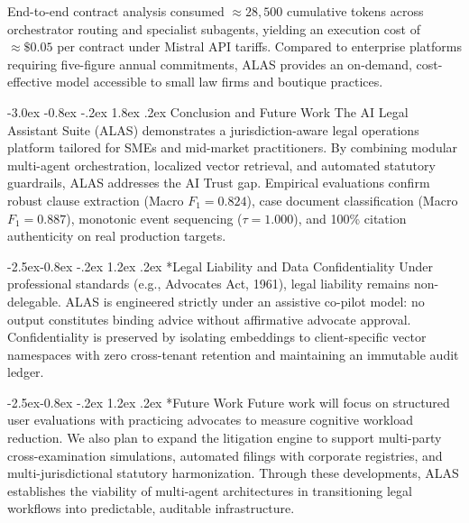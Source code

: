 \documentclass[3p,times,procedia]{elsarticle}
\makeatletter
\renewcommand\section{\@startsection {section}{1}{\z@}%
                                   {-3.0ex \@plus -0.8ex \@minus -.2ex}%
                                   {1.8ex \@plus.2ex}%
                                   {\fontsize{10}{12}\selectfont\bfseries\scshape}}
\renewcommand\subsection{\@startsection{subsection}{2}{\z@}%
                                     {-2.5ex\@plus -0.8ex \@minus -.2ex}%
                                     {1.2ex \@plus .2ex}%
                                     {\fontsize{10}{12}\selectfont\itshape}}
\makeatother
\begin{document}
End-to-end contract analysis consumed $\approx 28,500$ cumulative tokens across orchestrator routing and specialist subagents, yielding an execution cost of $\approx \$0.05$ per contract under Mistral API tariffs. Compared to enterprise platforms requiring five-figure annual commitments, ALAS provides an on-demand, cost-effective model accessible to small law firms and boutique practices.

\section{Conclusion and Future Work}
The AI Legal Assistant Suite (ALAS) demonstrates a jurisdiction-aware legal operations platform tailored for SMEs and mid-market practitioners. By combining modular multi-agent orchestration, localized vector retrieval, and automated statutory guardrails, ALAS addresses the AI Trust gap. Empirical evaluations confirm robust clause extraction (Macro $F_1 = 0.824$), case document classification (Macro $F_1 = 0.887$), monotonic event sequencing ($\tau = 1.000$), and 100\% citation authenticity on real production targets. 

\subsection*{Legal Liability and Data Confidentiality}
Under professional standards (e.g., Advocates Act, 1961), legal liability remains non-delegable. ALAS is engineered strictly under an assistive co-pilot model: no output constitutes binding advice without affirmative advocate approval. Confidentiality is preserved by isolating embeddings to client-specific vector namespaces with zero cross-tenant retention and maintaining an immutable audit ledger.

\subsection*{Future Work}
Future work will focus on structured user evaluations with practicing advocates to measure cognitive workload reduction. We also plan to expand the litigation engine to support multi-party cross-examination simulations, automated filings with corporate registries, and multi-jurisdictional statutory harmonization. Through these developments, ALAS establishes the viability of multi-agent architectures in transitioning legal workflows into predictable, auditable infrastructure.
\end{document}
